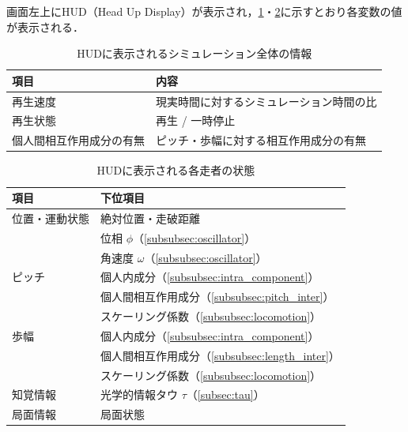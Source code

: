\documentclass{jsai2e}
\begin{document}
画面左上にHUD（Head Up Display）が表示され，\ref{table:hud1}・\ref{table:hud2}に示すとおり各変数の値が表示される．

\begin{table}[t]
\centering
\caption{HUDに表示されるシミュレーション全体の情報}
\label{table:hud1}
\small
\begin{tabularx}{\columnwidth}{lX}
\hline
項目 & 内容 \\
\hline
再生速度 & 現実時間に対するシミュレーション時間の比 \\
再生状態 & 再生 / 一時停止 \\
個人間相互作用成分の有無 & ピッチ・歩幅に対する相互作用成分の有無 \\
\hline
\end{tabularx}
\end{table}


\begin{table}[t]
\centering
\caption{HUDに表示される各走者の状態}
\label{table:hud2}
\small
\begin{tabularx}{\columnwidth}{lX}
\hline
項目 & 下位項目 \\
\hline

位置・運動状態
& 絶対位置・走破距離 \\
& 位相 $\phi$（\ref{subsubsec:oscillator}） \\
& 角速度 $\omega$（\ref{subsubsec:oscillator}） \\

\hline

ピッチ
& 個人内成分（\ref{subsubsec:intra_component}） \\
& 個人間相互作用成分（\ref{subsubsec:pitch_inter}） \\
& スケーリング係数（\ref{subsubsec:locomotion}） \\

\hline

歩幅
& 個人内成分（\ref{subsubsec:intra_component}） \\
& 個人間相互作用成分（\ref{subsubsec:length_inter}） \\
& スケーリング係数（\ref{subsubsec:locomotion}） \\

\hline

知覚情報
& 光学的情報タウ $\tau$（\ref{subsec:tau}） \\

\hline

局面情報
& 局面状態 \\

\hline
\end{tabularx}
\end{table}
\end{document}
